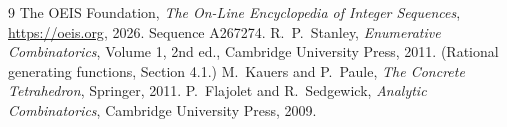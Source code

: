 \documentclass[11pt,a4paper]{article}
\theoremstyle{plain}
\theoremstyle{definition}
\begin{document}
\begin{thebibliography}{9}
 The OEIS Foundation, \emph{The On-Line Encyclopedia of Integer
Sequences}, \url{https://oeis.org}, 2026. Sequence A267274.
 R.~P.~Stanley, \emph{Enumerative Combinatorics}, Volume 1, 2nd ed.,
Cambridge University Press, 2011. (Rational generating functions, Section 4.1.)
 M.~Kauers and P.~Paule, \emph{The Concrete Tetrahedron}, Springer, 2011.
 P.~Flajolet and R.~Sedgewick, \emph{Analytic Combinatorics}, Cambridge
University Press, 2009.
\end{thebibliography}
\end{document}
